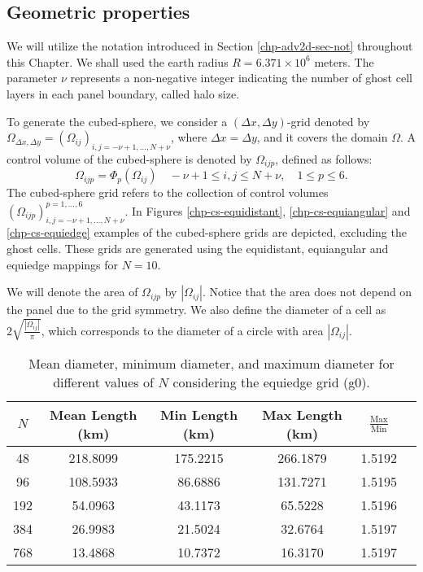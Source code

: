 \subsection{Geometric properties}
We will utilize the notation introduced in Section \ref{chp-adv2d-sec-not} throughout this Chapter.
We shall used the earth radius $R = 6.371 \times 10^6$ meters.
The parameter $\nu$ represents a non-negative integer indicating the number of ghost cell layers in each panel boundary, called halo size.

To generate the cubed-sphere, we consider a $(\Delta x, \Delta y)$-grid denoted by 
$\Omega_{\Delta x, \Delta y} = (\Omega_{ij})_{i,j=-\nu+1,\ldots,N+\nu}$, 
where $\Delta x = \Delta y$, and it covers the domain $\Omega$. 
A control volume of the cubed-sphere is denoted by $\Omega_{ijp}$, defined as follows:
\begin{equation*}
	\Omega_{ijp} = \Phi_p(\Omega_{ij})
	\quad -\nu+1 \leq i, j \leq N+\nu, \quad 1 \leq p \leq 6.
\end{equation*}
The cubed-sphere grid refers to the collection of control volumes 
$(\Omega_{ijp})_{i,j=-\nu+1,\ldots,N+\nu}^{p=1,\ldots,6}$. 
In Figures \ref{chp-cs-equidistant}, \ref{chp-cs-equiangular} and \ref{chp-cs-equiedge} examples of the cubed-sphere grids are depicted,
excluding the ghost cells.
These grids are generated using the equidistant, equiangular and equiedge mappings for $N=10$.

We will denote the area of $\Omega_{ijp}$ by $|\Omega_{ij}|$.
Notice that the area does not depend on the panel due to the grid symmetry.
We also define the diameter of a cell as $2\sqrt{\frac{|\Omega_{ij}|}{\pi}}$, which corresponds to the diameter of a circle with area $|\Omega_{ij}|$.

\begin{table}[htbp]
    \centering
    \caption{Mean diameter, minimum diameter, and maximum diameter for different values of $N$ considering the equiedge grid (g0).\label{g0-dx-table}}
    \begin{tabular}{cccccc}
        \toprule
        $N$ & Mean Length (km) & Min Length (km) & Max Length (km) & $\frac{\text{Max}}{\text{Min}}$ \\
        \midrule
        48 & 218.8099 & 175.2215 & 266.1879 & 1.5192 \\
        96 & 108.5933 & 86.6886 & 131.7271 & 1.5195 \\
        192 & 54.0963 & 43.1173 & 65.5228 & 1.5196 \\
        384 & 26.9983 & 21.5024 & 32.6764 & 1.5197 \\
        768 & 13.4868 & 10.7372 & 16.3170 & 1.5197 \\
        \bottomrule
    \end{tabular}
\end{table}

